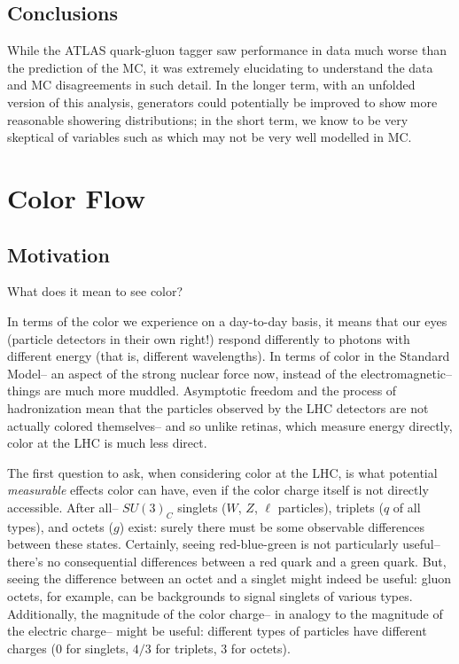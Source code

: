 \subsection{Conclusions}

While the ATLAS quark-gluon tagger saw performance in data much worse than the prediction of the \Pythia MC, it was extremely elucidating to understand the data and MC disagreements in such detail. In the longer term, with an unfolded version of this analysis, generators could potentially be improved to show more reasonable showering distributions; in the short term, we know to be very skeptical of variables such as \ntrk which may not be very well modelled in MC.

\FloatBarrier

\section{Color Flow}

\subsection{Motivation}

What does it mean to see color?

In terms of the color we experience on a day-to-day basis, it means that our eyes (particle detectors in their own right!) respond differently to photons with different energy (that is, different wavelengths). In terms of color in the Standard Model-- an aspect of the strong nuclear force now, instead of the electromagnetic-- things are much more muddled. Asymptotic freedom and the process of hadronization mean that the particles observed by the LHC detectors are not actually colored themselves-- and so unlike retinas, which measure energy directly, color at the LHC is much less direct.

The first question to ask, when considering color at the LHC, is what potential \textit{measurable} effects color can have, even if the color charge itself is not directly accessible. After all-- $SU(3)_C$ singlets ($W$, $Z$, $\ell$ particles), triplets ($q$ of all types), and octets ($g$) exist: surely there must be some observable differences between these states. Certainly, seeing red-blue-green is not particularly useful-- there's no consequential differences between a red quark and a green quark. But, seeing the difference between an octet and a singlet might indeed be useful: gluon octets, for example, can be backgrounds to signal singlets of various types. Additionally, the magnitude of the color charge-- in analogy to the magnitude of the electric charge-- might be useful: different types of particles have different charges (0 for singlets, $4/3$ for triplets, $3$ for octets). 

